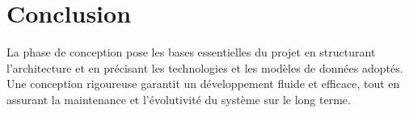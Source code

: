 \section{Conclusion}
La phase de conception pose les bases essentielles du projet en structurant
l'architecture et en précisant les technologies et les modèles de données
adoptés. Une conception rigoureuse garantit un développement fluide et
efficace, tout en assurant la maintenance et l'évolutivité du système sur le
long terme.

\clearpage